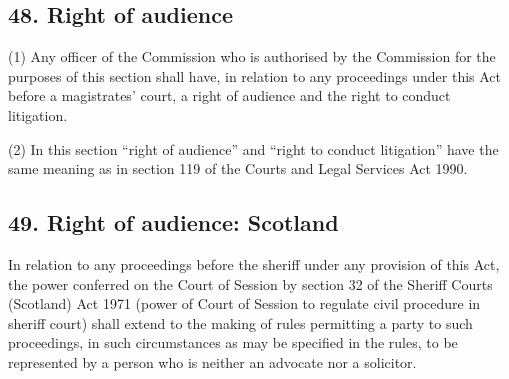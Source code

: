 \documentclass[12pt,a4paper]{article}
\begin{document}
\subsection{48. Right of audience}

(1) Any 
officer of the 
Commission  %
who is authorised  %
by the 
Commission  %
for the purposes of this section shall have, in relation to any proceedings under this Act before a magistrates' court, a right of audience and the right to conduct litigation.

(2) In this section “right of audience” and “right to conduct litigation” have the same meaning as in section 119 of the Courts and Legal Services Act 1990.


\subsection{49. Right of audience: Scotland}

In relation to any proceedings before the sheriff under any provision of this Act, the power conferred on the Court of Session by section 32 of the Sheriff Courts (Scotland) Act 1971 (power of Court of Session to regulate civil procedure in sheriff court) shall extend to the making of rules permitting a party to such proceedings, in such circumstances as may be specified in the rules, to be represented by a person who is neither an advocate nor a solicitor.

\end{document}
